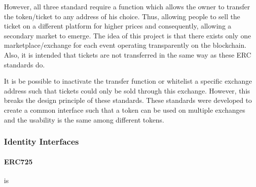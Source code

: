 However, all three standard require a function which allows the owner to transfer the token/ticket to any address of his choice. Thus, allowing people to sell the ticket on a different platform for higher prices and consequently, allowing a secondary market to emerge. The idea of this project is that there exists only one marketplace/exchange for each event operating transparently on the blockchain. Also, it is intended that tickets are not transferred in the same way as these ERC standards do.

It is be possible to inactivate the transfer function or whitelist a specific exchange address such that tickets could only be sold through this exchange. However, this breaks the design principle of these standards. These standards were developed to create a common interface such that a token can be used on multiple exchanges and the usability is the same among different tokens. 

\subsubsection{Identity Interfaces}

\paragraph{ERC725} is